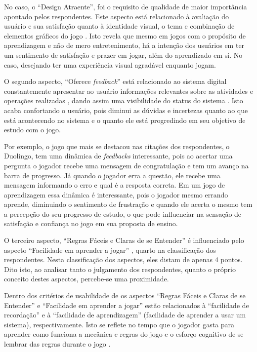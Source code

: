 

No caso, o ``Design Atraente'', foi o requisito de qualidade de maior importância apontado pelos respondentes. Este aspecto está relacionado à avaliação do usuário e sua satisfação quanto à identidade visual, o tema e combinação de elementos gráficos do jogo \cite{silva_sales_mendes2021}. Isto revela que mesmo em jogos com o propósito de aprendizagem e não de mero entretenimento, há a intenção dos usuários em ter um sentimento de satisfação e prazer em jogar, além do aprendizado em si. No caso, desejando ter uma experiência visual agradável enquanto jogam.

O segundo aspecto, ``Oferece \textit{feedback}'' está relacionado ao sistema digital constantemente apresentar ao usuário informações relevantes sobre as atividades e operações realizadas \cite{silva_sales_mendes2021}, dando assim uma visibilidade do status do sistema \cite{Preece_Rogers_Sharp_2005}. Isto acaba confortando o usuário, pois diminui as dúvidas e incertezas quanto ao que está acontecendo no sistema e o quanto ele está progredindo em seu objetivo de estudo com o jogo. 

Por exemplo, o jogo que mais se destacou nas citações dos respondentes, o Duolingo, tem uma dinâmica de \textit{feedbacks} interessante, pois ao acertar uma pergunta o jogador recebe uma mensagem de congratulação e tem um avanço na barra de progresso. Já quando o jogador erra a questão, ele recebe uma mensagem informando o erro e qual é a resposta correta. Em um jogo de aprendizagem essa dinâmica é interessante, pois o jogador mesmo errando aprende, diminuindo o sentimento de frustração e quando ele acerta o mesmo tem a percepção do seu progresso de estudo, o que pode influenciar na sensação de satisfação e confiança no jogo em sua proposta de ensino.

O terceiro aspecto, ``Regras Fáceis e Claras de se Entender'' é influenciado pelo aspecto ``Facilidade em aprender a jogar'' \cite{Petri_Wangenheim_2019}, quarto na classificação dos respondentes. Nesta classificação dos aspectos, eles distam de apenas 4 pontos. Dito isto, ao analisar tanto o julgamento dos respondentes, quanto o próprio conceito destes aspectos, percebe-se uma proximidade. 

Dentro dos critérios de usabilidade de  os aspectos ``Regras Fáceis e Claras de se Entender'' e ``Facilidade em aprender a jogar'' estão relacionados à ``facilidade de recordação'' e à ``facilidade de aprendizagem'' (facilidade de aprender a usar um sistema), respectivamente. Isto se reflete no tempo que o jogador gasta para aprender como funciona a mecânica e regras do jogo e o esforço cognitivo de se lembrar das regras durante o jogo \cite{silva_sales_mendes2021}. 

